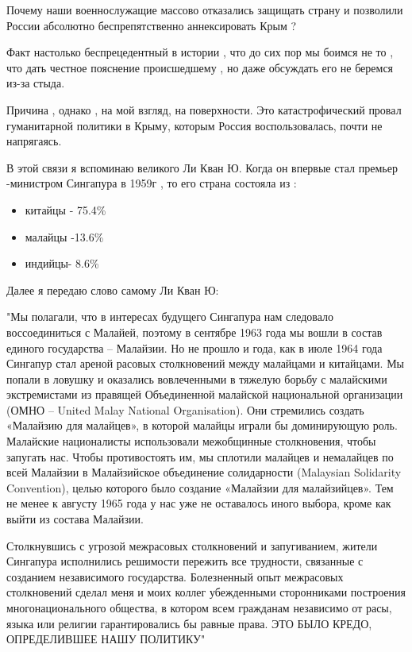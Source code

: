 Почему наши военнослужащие массово отказались защищать страну и позволили
России  абсолютно беспрепятственно аннексировать  Крым ?

Факт настолько беспрецедентный в  истории , что до сих пор мы боимся не то ,
что дать честное пояснение происшедшему  , но даже обсуждать его не беремся
из-за стыда.

Причина , однако , на мой взгляд,  на поверхности.  Это  катастрофический
провал гуманитарной политики в Крыму, которым Россия   воспользовалась,  почти
не напрягаясь.

В этой связи я вспоминаю великого Ли Кван Ю. Когда он впервые стал премьер
-министром Сингапура  в 1959г , то его страна состояла  из :

\begin{itemize}
  \item китайцы - 75.4\%
  \item малайцы -13.6\%
  \item индийцы-  8.6\%
\end{itemize}

Далее  я передаю слово самому Ли Кван Ю:

"Мы полагали, что в интересах будущего Сингапура нам следовало воссоединиться с
Малайей, поэтому в сентябре 1963 года мы вошли в состав единого государства –
Малайзии. Но не прошло и года, как в июле 1964 года Сингапур стал ареной
расовых столкновений между малайцами и китайцами. Мы попали в ловушку и
оказались вовлеченными в тяжелую борьбу с малайскими экстремистами из правящей
Объединенной малайской национальной организации (ОМНО – United Malay National
Organisation). Они стремились создать «Малайзию для малайцев», в которой
малайцы играли бы доминирующую роль. Малайские националисты использовали
межобщинные столкновения, чтобы запугать нас. Чтобы противостоять им, мы
сплотили малайцев и немалайцев по всей Малайзии в Малайзийское объединение
солидарности (Malaysian Solidarity Convention), целью которого было создание
«Малайзии для малайзийцев». Тем не менее к августу 1965 года у нас уже не
оставалось иного выбора, кроме как выйти из состава Малайзии. 

Столкнувшись с угрозой межрасовых столкновений и запугиванием, жители Сингапура
исполнились решимости пережить все трудности, связанные с созданием
независимого государства. Болезненный опыт межрасовых столкновений сделал меня
и моих коллег убежденными сторонниками построения многонационального общества,
в котором всем гражданам независимо от расы, языка или религии гарантировались
бы равные права.  ЭТО БЫЛО КРЕДО, ОПРЕДЕЛИВШЕЕ  НАШУ ПОЛИТИКУ"


